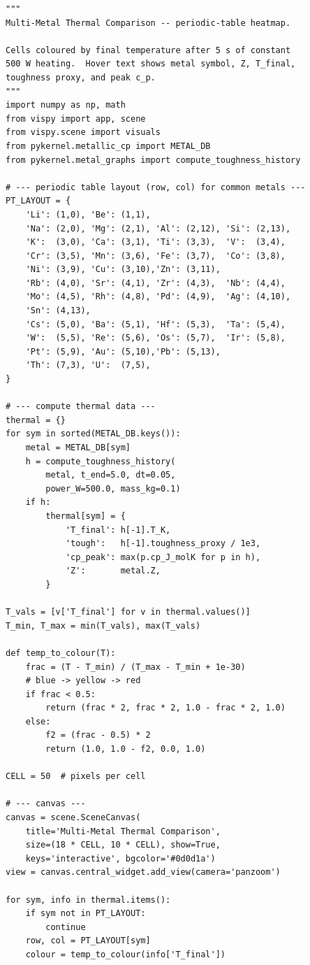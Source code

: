 \documentclass[11pt,a4paper]{article}
\begin{document}
\begin{lstlisting}[title={\textbf{Live VisPy periodic-table thermal heatmap}}]
"""
Multi-Metal Thermal Comparison -- periodic-table heatmap.

Cells coloured by final temperature after 5 s of constant
500 W heating.  Hover text shows metal symbol, Z, T_final,
toughness proxy, and peak c_p.
"""
import numpy as np, math
from vispy import app, scene
from vispy.scene import visuals
from pykernel.metallic_cp import METAL_DB
from pykernel.metal_graphs import compute_toughness_history

# --- periodic table layout (row, col) for common metals ---
PT_LAYOUT = {
    'Li': (1,0), 'Be': (1,1),
    'Na': (2,0), 'Mg': (2,1), 'Al': (2,12), 'Si': (2,13),
    'K':  (3,0), 'Ca': (3,1), 'Ti': (3,3),  'V':  (3,4),
    'Cr': (3,5), 'Mn': (3,6), 'Fe': (3,7),  'Co': (3,8),
    'Ni': (3,9), 'Cu': (3,10),'Zn': (3,11),
    'Rb': (4,0), 'Sr': (4,1), 'Zr': (4,3),  'Nb': (4,4),
    'Mo': (4,5), 'Rh': (4,8), 'Pd': (4,9),  'Ag': (4,10),
    'Sn': (4,13),
    'Cs': (5,0), 'Ba': (5,1), 'Hf': (5,3),  'Ta': (5,4),
    'W':  (5,5), 'Re': (5,6), 'Os': (5,7),  'Ir': (5,8),
    'Pt': (5,9), 'Au': (5,10),'Pb': (5,13),
    'Th': (7,3), 'U':  (7,5),
}

# --- compute thermal data ---
thermal = {}
for sym in sorted(METAL_DB.keys()):
    metal = METAL_DB[sym]
    h = compute_toughness_history(
        metal, t_end=5.0, dt=0.05,
        power_W=500.0, mass_kg=0.1)
    if h:
        thermal[sym] = {
            'T_final': h[-1].T_K,
            'tough':   h[-1].toughness_proxy / 1e3,
            'cp_peak': max(p.cp_J_molK for p in h),
            'Z':       metal.Z,
        }

T_vals = [v['T_final'] for v in thermal.values()]
T_min, T_max = min(T_vals), max(T_vals)

def temp_to_colour(T):
    frac = (T - T_min) / (T_max - T_min + 1e-30)
    # blue -> yellow -> red
    if frac < 0.5:
        return (frac * 2, frac * 2, 1.0 - frac * 2, 1.0)
    else:
        f2 = (frac - 0.5) * 2
        return (1.0, 1.0 - f2, 0.0, 1.0)

CELL = 50  # pixels per cell

# --- canvas ---
canvas = scene.SceneCanvas(
    title='Multi-Metal Thermal Comparison',
    size=(18 * CELL, 10 * CELL), show=True,
    keys='interactive', bgcolor='#0d0d1a')
view = canvas.central_widget.add_view(camera='panzoom')

for sym, info in thermal.items():
    if sym not in PT_LAYOUT:
        continue
    row, col = PT_LAYOUT[sym]
    colour = temp_to_colour(info['T_final'])


\end{lstlisting}
\end{document}
